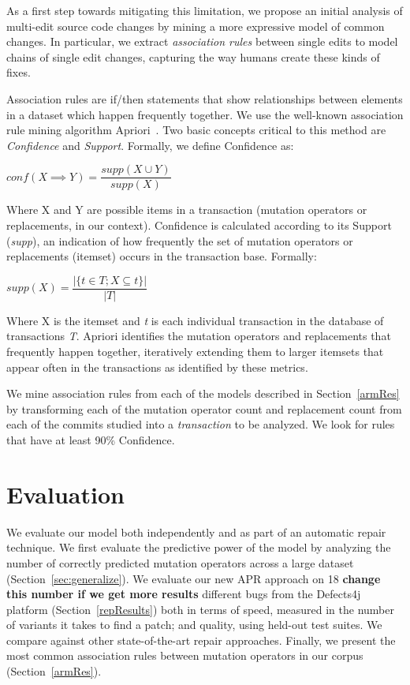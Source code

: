 \documentclass[conference]{IEEEtran}
\newcommand{\todo}[1]
  {{\scriptsize \textbf{\color{red} {#1}}}}
\begin{document}
As a first step towards mitigating this limitation, we propose 
an initial analysis of multi-edit 
source code changes by mining a more expressive model of common changes. In
particular, we extract \emph{association rules} between single edits 
to model chains of single edit changes, capturing the way humans create these kinds of fixes.

Association rules are if/then statements that show relationships between elements in a dataset which happen frequently together. We use the 
well-known association rule mining algorithm
Apriori~\cite{Agrawal94}. 
%
Two basic concepts critical to this method are \emph{Confidence} and \emph{Support}.
Formally, we define Confidence as:

\begin{center}
$conf(X \implies Y) = \dfrac{supp(X \cup Y)}{supp(X)}$ 
\end{center}

Where X and Y are possible items in a transaction (mutation operators or replacements, in our
context). Confidence is calculated according to its Support (\emph{supp}), 
an indication of how frequently the set of mutation operators or replacements (itemset) 
 occurs in the transaction base.
Formally:

\begin{center}
$supp(X) = \dfrac{|\{t \in T; X \subseteq t\}|}{|T|}$
\end{center}

Where X is the itemset and \emph{t} is each individual transaction in
the database of transactions \emph{T}. Apriori identifies the mutation
operators and replacements that frequently happen together, iteratively extending them to larger
itemsets that appear often in the transactions as identified by these metrics.

We mine association rules from each of the models described in Section~\ref{armRes} by transforming each of the mutation operator count and replacement count from 
each of the commits studied into a \emph{transaction} to be analyzed. 
We look for rules that have at least 90\% Confidence.


\section{Evaluation} \label{evaluation}

We evaluate our model both independently and as part of an automatic repair
technique.  We first evaluate the predictive power of the model by analyzing the
number of correctly predicted mutation operators across a large dataset
(Section~\ref{sec:generalize}). We evaluate our new APR approach on 18 \todo{
  change this number if we get more results} different bugs from the Defects4j
platform (Section~\ref{repResults}) both in terms of speed, measured in the
number of variants it takes to find a patch; and quality, using held-out test
suites.  We compare against other state-of-the-art repair approaches.  Finally, we present the most common  
association rules between mutation operators in our corpus
(Section~\ref{armRes}). 
\end{document}
